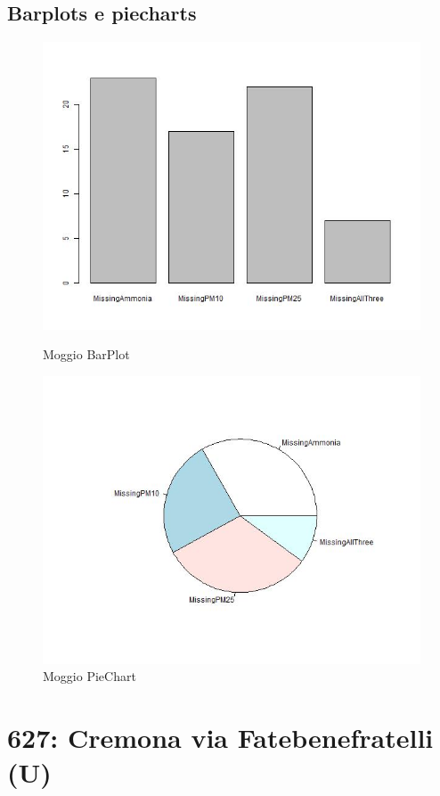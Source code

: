 \documentclass{article}
\begin{document}
\subsection{Barplots e piecharts}
\begin{figure}[H]
  \centering 
  \includegraphics[scale = 0.4]{Picture/Barplots e piecharts/Moggio BarPlotMV.jpeg}
  \caption{Moggio BarPlot}
  \centering
  \centering 
  \includegraphics[scale = 0.4]{Picture/Barplots e piecharts/Moggio PieChartMV.jpeg}
  \caption{Moggio PieChart}
  \centering
\end{figure}

\section{627: Cremona via Fatebenefratelli (U)}
\end{document}
